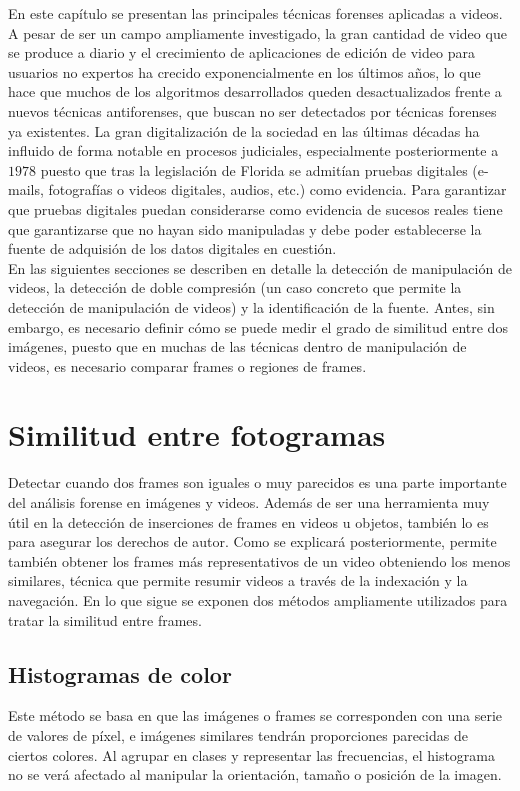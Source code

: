 En este capítulo se presentan las principales técnicas forenses aplicadas a videos. A pesar de ser un campo ampliamente investigado, la gran cantidad de video que se produce a diario y el crecimiento de aplicaciones de edición de video para usuarios no expertos ha crecido exponencialmente en los últimos a\~nos, lo que hace que muchos de los algoritmos desarrollados queden desactualizados frente a nuevos técnicas antiforenses, que buscan no ser detectados por técnicas forenses ya existentes. 
La gran digitalización de la sociedad en las últimas décadas ha influido de forma notable en procesos judiciales, especialmente posteriormente a $1978$ puesto que tras la legislación de Florida se admitían pruebas digitales (e-mails, fotografías o videos digitales, audios, etc.) como evidencia. Para garantizar que pruebas digitales puedan considerarse como evidencia de sucesos reales tiene que garantizarse que no hayan sido manipuladas y debe poder establecerse la fuente de adquisión de los datos digitales en cuestión. \\

En las siguientes secciones se describen en detalle la detección de manipulación de videos, la detección de doble compresión (un caso concreto que permite la detección de manipulación de videos) y la identificación de la fuente. Antes, sin embargo, es necesario definir cómo se puede medir el grado de similitud entre dos imágenes, puesto que en muchas de las técnicas dentro de manipulación de videos, es necesario comparar frames o regiones de frames. \\

\section{Similitud entre fotogramas}
Detectar cuando dos frames son iguales o muy parecidos es una parte importante del análisis forense en imágenes y videos. Además de ser una herramienta muy útil en la detección de inserciones de frames en videos u objetos, también lo es para asegurar los derechos de autor. Como se explicará posteriormente, permite también obtener los frames más representativos de un video obteniendo los menos similares, técnica que permite resumir videos a través de la indexación y la navegación. En lo que sigue se exponen dos métodos ampliamente utilizados para tratar la similitud entre frames. \\

\subsection{Histogramas de color}
Este método se basa en que las imágenes o frames se corresponden con una serie de valores de píxel, e imágenes similares tendrán proporciones parecidas de ciertos colores\cite{jain:1996}. Al agrupar en clases y representar las frecuencias, el histograma no se verá afectado al manipular la orientación, tama\~no o posición de la imagen. \\

